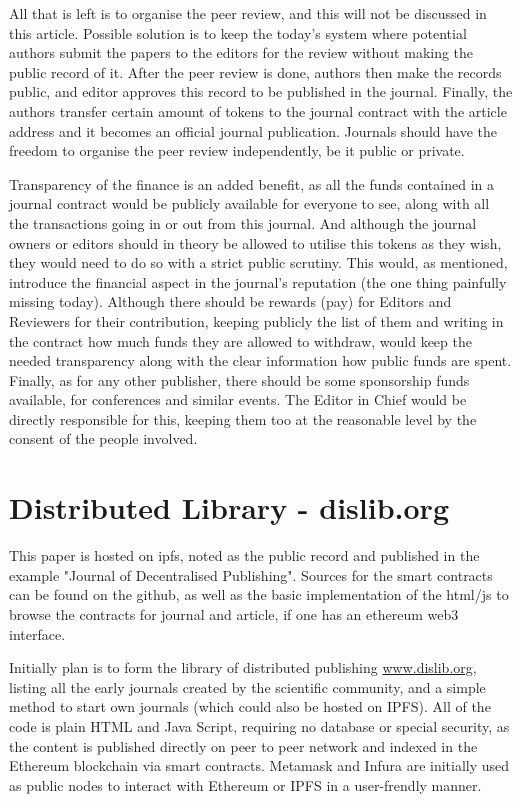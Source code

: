 \documentclass[12pt, a4paper]{article}
\begin{document}
All that is left is to organise the peer review, and this will not be discussed in this article. Possible solution is to keep the today's system where potential authors submit the papers to the editors for the review without making the public record of it. After the peer review is done, authors then make the records public, and editor approves this record to be published in the journal. Finally, the authors transfer certain amount of tokens to the journal contract with the article address and it becomes an official journal publication. Journals should have the freedom to organise the peer review independently, be it public or private.

Transparency of the finance is an added benefit, as all the funds contained in a journal contract would be publicly available for everyone to see, along with all the transactions going in or out from this journal. And although the journal owners or editors should in theory be allowed to utilise this tokens as they wish, they would need to do so with a strict public scrutiny. This would, as mentioned, introduce the financial aspect in the journal's reputation (the one thing painfully missing today). Although there should be rewards (pay) for Editors and Reviewers for their contribution, keeping publicly the list of them and writing in the contract how much funds they are allowed to withdraw, would keep the needed transparency along with the clear information how public funds are spent. Finally, as for any other publisher, there should be some sponsorship funds available, for conferences and similar events. The Editor in Chief would be directly responsible for this, keeping them too at the reasonable level by the consent of the people involved.

\section{Distributed Library - dislib.org}
This paper is hosted on ipfs, noted as the public record and published in the example "Journal of Decentralised Publishing". Sources for the smart contracts can be found on the github, as well as the basic implementation of the html/js to browse the contracts for journal and article, if one has an ethereum web3 interface.

Initially plan is to form the library of distributed publishing \href{http://www.dislib.org}{www.dislib.org}, listing all the early journals created by the scientific community, and a simple method to start own journals (which could also be hosted on IPFS). All of the code is plain HTML and Java Script, requiring no database or special security, as the content is published directly on peer to peer network and indexed in the Ethereum blockchain via smart contracts.
Metamask \cite{metamask-1} and Infura \cite{infura-1} are initially used as public nodes to interact with Ethereum or IPFS in a user-frendly manner.
\end{document}
